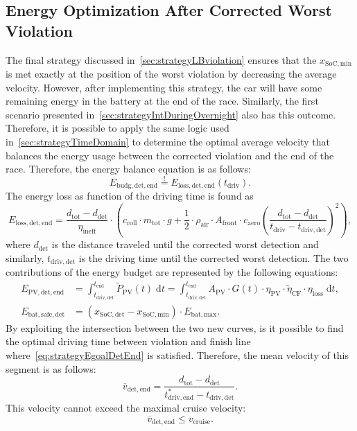 \subsection{Energy Optimization After Corrected Worst Violation}
\label{sec:strategyEleft}
The final strategy discussed in~\ref{sec:strategyLBviolation} ensures that the $x_\mathrm{SoC,min}$ is met exactly at the position of the worst violation by decreasing the average velocity. However, after implementing this strategy, the car will have some remaining energy in the battery at the end of the race. Similarly, the first scenario presented in~\ref{sec:strategyIntDuringOvernight} also has this outcome. Therefore, it is possible to apply the same logic used in~\ref{sec:strategyTimeDomain} to determine the optimal average velocity that balances the energy usage between the corrected violation and the end of the race. Therefore, the energy balance equation is as follows:
\begin{equation}
	E_{\mathrm{budg,det,end}} \overset{!}{=} E_{\mathrm{loss,det,end}}(t_\mathrm{driv}). \label{eq:strategyEgoalDetEnd}
\end{equation}
The energy loss as function of the driving time is found as
\begin{equation}
	E_{\mathrm{loss,det,end}} = \frac{d_\mathrm{tot} - d_\mathrm{det}}{\eta_\mathrm{ineff}} \cdot \left(c_\mathrm{roll} \cdot m_\mathrm{tot} \cdot g + \frac{1}{2} \cdot \rho_\mathrm{air} \cdot A_\mathrm{front} \cdot c_\mathrm{aero} \left(\frac{d_\mathrm{tot} - d_\mathrm{det}}{t_\mathrm{driv} - t_\mathrm{driv,det}} \right)^2 \right),
\end{equation}
where $d_\mathrm{det}$ is the distance traveled until the corrected worst detection and similarly, $t_\mathrm{driv,det}$ is the driving time until the corrected worst detection. The two contributions of the energy budget are represented by the following equations:
\begin{align}
	E_\mathrm{PV,det,end} &= \int_{t_\mathrm{driv,det}}^{t_\mathrm{end}} \tilde{P}_\mathrm{PV}(t) \;\mathrm{d}t = \int_{t_\mathrm{driv,det}}^{t_\mathrm{end}} A_\mathrm{PV} \cdot G(t) \cdot \eta_\mathrm{PV} \cdot \tilde{\eta}_\mathrm{CF} \cdot \eta_\mathrm{loss} \;\mathrm{d}t, \\
	E_\mathrm{bat,safe,det} &= (x_\mathrm{SoC,det} - x_\mathrm{SoC,min}) \cdot E_\mathrm{bat,max}.
\end{align}
By exploiting the intersection between the two new curves, is it possible to find the optimal driving time between violation and finish line where~\cref{eq:strategyEgoalDetEnd} is satisfied. Therefore, the mean velocity of this segment is as follows:
\begin{equation}
	\overline{v}_\mathrm{det,end} = \frac{d_\mathrm{tot} - d_\mathrm{det}}{t_\mathrm{driv,end}^* - t_\mathrm{driv,det}}.
\end{equation}
This velocity cannot exceed the maximal cruise velocity:
\begin{equation}
	\overline{v}_\mathrm{det,end} \leq v_\mathrm{cruise}.
\end{equation}

